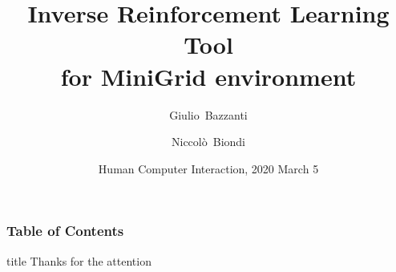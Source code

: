 \documentclass[10pt]{beamer}
\title[Inverse Reinforcement Learning Tool for MiniGrid environment] %
{Inverse Reinforcement Learning Tool \\ for MiniGrid environment }
\author[Giulio Bazzanti, Niccolò Biondi] %
{Giulio~Bazzanti \and Niccolò~Biondi}
\date[HCI 2020] %
{Human Computer Interaction, 2020 March 5}
\begin{document}
	
\begin{frame}[plain]
	\titlepage
	\addtocounter{framenumber}{-1}
\end{frame}

\begin{frame}[plain]
\frametitle{Table of Contents}
\tableofcontents

\addtocounter{framenumber}{-1}
\end{frame}


\begin{frame}[plain]
	\vfill
	\centering
	\begin{beamercolorbox}[sep=8pt,center,shadow=true,rounded=true]{title}
		Thanks for the attention\par%
	\end{beamercolorbox}
	\vfill
	\addtocounter{framenumber}{-1}
\end{frame}
\end{document}
